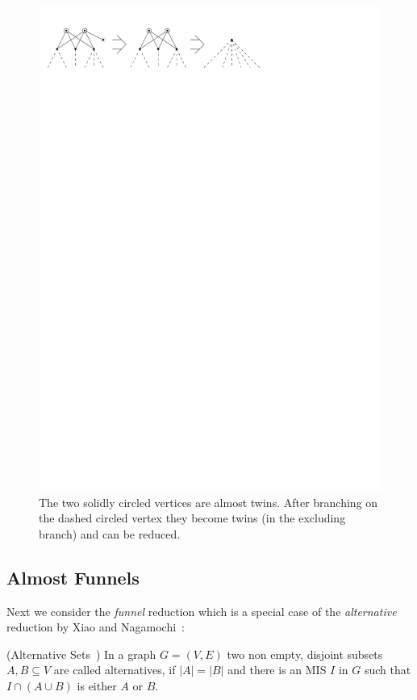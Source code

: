 \documentclass[a4paper,UKenglish,cleveref, autoref, thm-restate]{lipics-v2021}
\begin{document}
\begin{figure}[t]
  \centering
  \includegraphics[scale=1]{figures/twin}
  \caption{The two solidly circled vertices are almost twins. After branching on
  the dashed circled vertex they become twins (in the excluding branch) and can
  be reduced.}
  \label{fig:twin}
\end{figure}

\subsection{Almost Funnels}
\label{sec:almost_funnels}

Next we consider the \emph{funnel} reduction which is a special case of the
\emph{alternative} reduction by Xiao and Nagamochi~\cite{XiaoUnconfined}:

\begin{definition} (Alternative Sets~\cite{XiaoUnconfined})
	In a graph $G=(V,E)$ two non empty, disjoint subsets $A,B\subseteq V$ are
    called alternatives, if $|A| = |B|$ and there is an MIS $I$ in $G$ such that $I\cap(A\cup B)$ is either $A$ or $B$.
\end{definition}
\end{document}
